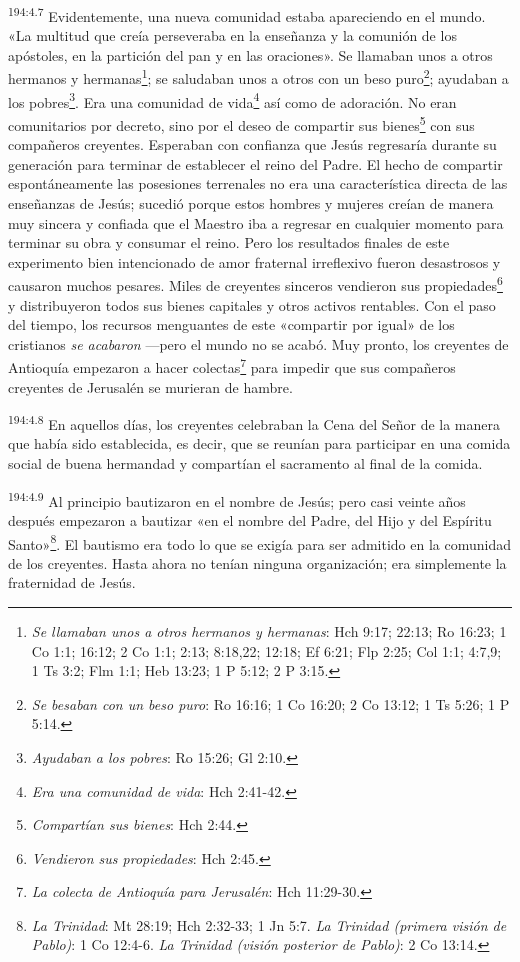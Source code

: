 \par 
\textsuperscript{194:4.7} Evidentemente, una nueva comunidad estaba apareciendo en el mundo. «La multitud que creía perseveraba en la enseñanza y la comunión de los apóstoles, en la partición del pan y en las oraciones». Se llamaban unos a otros hermanos y hermanas\footnote{\textit{Se llamaban unos a otros hermanos y hermanas}: Hch 9:17; 22:13; Ro 16:23; 1 Co 1:1; 16:12; 2 Co 1:1; 2:13; 8:18,22; 12:18; Ef 6:21; Flp 2:25; Col 1:1; 4:7,9; 1 Ts 3:2; Flm 1:1; Heb 13:23; 1 P 5:12; 2 P 3:15.}; se saludaban unos a otros con un beso puro\footnote{\textit{Se besaban con un beso puro}: Ro 16:16; 1 Co 16:20; 2 Co 13:12; 1 Ts 5:26; 1 P 5:14.}; ayudaban a los pobres\footnote{\textit{Ayudaban a los pobres}: Ro 15:26; Gl 2:10.}. Era una comunidad de vida\footnote{\textit{Era una comunidad de vida}: Hch 2:41-42.} así como de adoración. No eran comunitarios por decreto, sino por el deseo de compartir sus bienes\footnote{\textit{Compartían sus bienes}: Hch 2:44.} con sus compañeros creyentes. Esperaban con confianza que Jesús regresaría durante su generación para terminar de establecer el reino del Padre. El hecho de compartir espontáneamente las posesiones terrenales no era una característica directa de las enseñanzas de Jesús; sucedió porque estos hombres y mujeres creían de manera muy sincera y confiada que el Maestro iba a regresar en cualquier momento para terminar su obra y consumar el reino. Pero los resultados finales de este experimento bien intencionado de amor fraternal irreflexivo fueron desastrosos y causaron muchos pesares. Miles de creyentes sinceros vendieron sus propiedades\footnote{\textit{Vendieron sus propiedades}: Hch 2:45.} y distribuyeron todos sus bienes capitales y otros activos rentables. Con el paso del tiempo, los recursos menguantes de este «compartir por igual» de los cristianos \textit{se acabaron} ---pero el mundo no se acabó. Muy pronto, los creyentes de Antioquía empezaron a hacer colectas\footnote{\textit{La colecta de Antioquía para Jerusalén}: Hch 11:29-30.} para impedir que sus compañeros creyentes de Jerusalén se murieran de hambre.

\par 
\textsuperscript{194:4.8} En aquellos días, los creyentes celebraban la Cena del Señor de la manera que había sido establecida, es decir, que se reunían para participar en una comida social de buena hermandad y compartían el sacramento al final de la comida.

\par 
\textsuperscript{194:4.9} Al principio bautizaron en el nombre de Jesús; pero casi veinte años después empezaron a bautizar «en el nombre del Padre, del Hijo y del Espíritu Santo»\footnote{\textit{La Trinidad}: Mt 28:19; Hch 2:32-33; 1 Jn 5:7. \textit{La Trinidad (primera visión de Pablo)}: 1 Co 12:4-6. \textit{La Trinidad (visión posterior de Pablo)}: 2 Co 13:14.}. El bautismo era todo lo que se exigía para ser admitido en la comunidad de los creyentes. Hasta ahora no tenían ninguna organización; era simplemente la fraternidad de Jesús.

